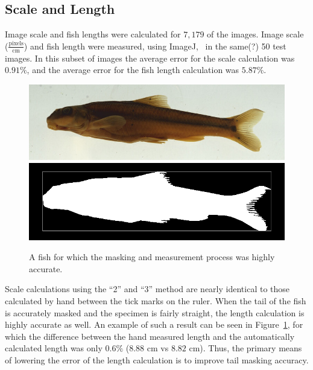 \documentclass[conference]{IEEEtran}
\begin{document}
\subsection{Scale and Length}
Image scale and fish lengths were calculated for \(7,179\) of the images.
Image scale ($\frac{\mathrm{pixels}}{\mathrm{cm}}$) and fish length were
measured, using ImageJ,~\cite{imagejCite} in the same(?) 50 test images.
In this subset of images the average error for the scale calculation
was \(0.91\%\), and the average error for the fish length calculation was \(5.87\%\).
\begin{figure}[H]
  \centering
  \includegraphics[width=0.49\linewidth]{images/54172}
  \includegraphics[width=0.49\linewidth]{images/54172_mask}
  \caption{A fish for which the masking and measurement process was highly accurate.}
  \label{fig:scale_len}
\end{figure}
Scale calculations using the ``2'' and ``3'' method are nearly identical to those calculated by hand between the tick marks on the ruler. When the tail of the fish is accurately masked and the specimen is fairly straight, the length calculation is highly accurate as well. An example of such a result can be seen in Figure~\ref{fig:scale_len}, for which the difference between the hand measured length and the automatically calculated length was only \(0.6\%\) (\(8.88\) cm vs \(8.82\) cm). Thus, the primary means of lowering the error of the length calculation is to improve tail masking accuracy.
\end{document}
